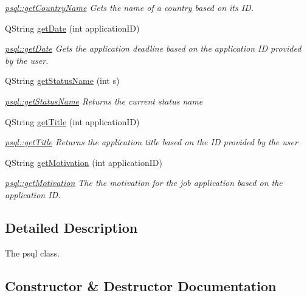 \begin{DoxyCompactItemize}
\begin{DoxyCompactList}\small\item\em \mbox{\hyperlink{classpsql_a5724e9992e6a5c98524ab73b98f4202d}{psql\+::get\+Country\+Name}} Gets the name of a country based on its ID. \end{DoxyCompactList}\item 
Q\+String \mbox{\hyperlink{classpsql_a561f96bfe7e9d092077712dd6b186af8}{get\+Date}} (int application\+ID)
\begin{DoxyCompactList}\small\item\em \mbox{\hyperlink{classpsql_a561f96bfe7e9d092077712dd6b186af8}{psql\+::get\+Date}} Gets the application deadline based on the application ID provided by the user. \end{DoxyCompactList}\item 
Q\+String \mbox{\hyperlink{classpsql_a5c2a64419a68a258071fd1f9a37c7c09}{get\+Status\+Name}} (int s)
\begin{DoxyCompactList}\small\item\em \mbox{\hyperlink{classpsql_a5c2a64419a68a258071fd1f9a37c7c09}{psql\+::get\+Status\+Name}} Returns the current status name \end{DoxyCompactList}\item 
Q\+String \mbox{\hyperlink{classpsql_ada9e3be3e0866011edf53e30ec510afc}{get\+Title}} (int application\+ID)
\begin{DoxyCompactList}\small\item\em \mbox{\hyperlink{classpsql_ada9e3be3e0866011edf53e30ec510afc}{psql\+::get\+Title}} Returns the application title based on the ID provided by the user \end{DoxyCompactList}\item 
Q\+String \mbox{\hyperlink{classpsql_aca1b2273937491e113089c1547caf49b}{get\+Motivation}} (int application\+ID)
\begin{DoxyCompactList}\small\item\em \mbox{\hyperlink{classpsql_aca1b2273937491e113089c1547caf49b}{psql\+::get\+Motivation}} The the motivation for the job application based on the application ID. \end{DoxyCompactList}\end{DoxyCompactItemize}


\subsection{Detailed Description}
The psql class. 

\subsection{Constructor \& Destructor Documentation}
\mbox{\label{classpsql_aaff5fe0931dce097850982e44e6361af}} 
